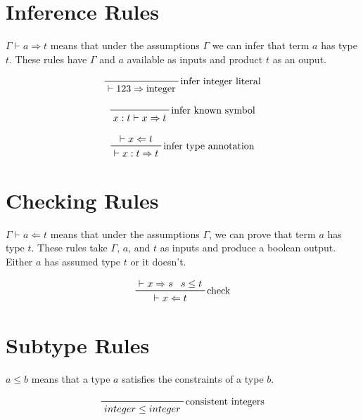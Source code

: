 \documentclass[11pt]{article}
\newcommand{\subtype}{\leq}
\newcommand{\infers}{\Rightarrow}
\newcommand{\checks}{\Leftarrow}
\newcommand{\context}{\vdash}
\begin{document}
\section{Inference Rules}

$\Gamma \vdash a \infers t$ means that under the assumptions $\Gamma$ we can infer that term $a$ has type $t$. These rules have $\Gamma$ and $a$ available as inputs and product $t$ as an ouput.

$$
\prfbyaxiom
	{infer integer literal}
	{\context 123 \infers \textnormal{integer}}
$$

$$
\prfbyaxiom
	{infer known symbol}
	{x : t \context x \infers t}
$$

$$
\prftree[r]
	{infer type annotation}
	{\context x \checks t}
	{\context x : t \infers t}
$$

\section{Checking Rules}

$\Gamma \context a \checks t$ means that under the assumptions $\Gamma$, we can prove that term $a$ has type $t$. These rules take $\Gamma$, $a$, and $t$ as inputs and produce a boolean output. Either $a$ has assumed type $t$ or it doesn't.

$$
\prftree[r]
	{check}
	{\context x \infers s}
	{s \subtype t}
	{\context x \checks t}
$$

\section{Subtype Rules}

$a \subtype b$ means that a type $a$ satisfies the constraints of a type $b$.

$$
\prfbyaxiom
	{consistent integers}
	{integer \subtype integer}
$$
\end{document}

